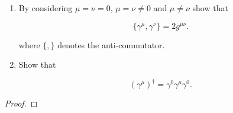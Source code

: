 \begin{Problem}

\begin{enumerate}[label=(\alph*)]
\item By considering \(\mu = \nu = 0\), \(\mu = \nu \neq 0\) and \(\mu \neq \nu\) show that

\[ \{ \gamma^{\mu}, \gamma^{\nu} \} = 2g^{\mu\nu}. \]

where \(\{ , \}\) denotes the anti-commutator.

\item Show that

\[ (\gamma^{\mu})^{\dagger} = \gamma^{0} \gamma^{\mu} \gamma^{0}. \]
\end{enumerate}
\end{Problem}
\begin{proof}
	\noindent



\end{proof}
